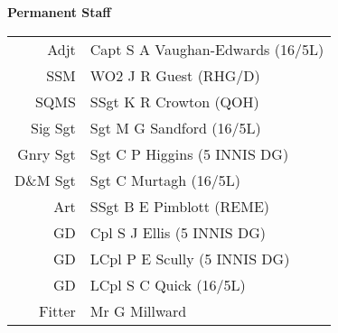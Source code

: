 \vspace*{10mm}

\begin{center}
  \Large
  \textbf{Permanent Staff}
\end{center}

\begin{center}
  \begin{tabular}{rl}
    Adjt & Capt S A Vaughan-Edwards (16/5L) \\
    SSM & WO2 J R Guest (RHG/D) \\
    SQMS & SSgt K R Crowton (QOH) \\
    Sig Sgt & Sgt M G Sandford (16/5L) \\
    Gnry Sgt & Sgt C P Higgins (5 INNIS DG) \\
    D\&M Sgt & Sgt C Murtagh (16/5L) \\
    Art & SSgt B E Pimblott (REME) \\
    GD & Cpl S J Ellis (5 INNIS DG) \\
    GD & LCpl P E Scully (5 INNIS DG) \\
    GD & LCpl S C Quick (16/5L) \\
    Fitter & Mr G Millward \\
  \end{tabular}
\end{center}
